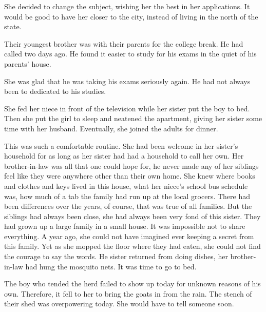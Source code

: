 \documentclass{article}
\begin{document}
She decided to change the subject, wishing her the best in her applications. It would be good to have her closer to the city, instead of living in the north of the state. 

Their youngest brother was with their parents for the college break. He had called two days ago. He found it easier to study for his exams in the quiet of his parents' house. 

She was glad that he was taking his exams seriously again. He had not always been to dedicated to his studies.

She fed her niece in front of the television while her sister put the boy to bed. Then she put the girl to sleep and neatened the apartment, giving her sister some time with her husband. Eventually, she joined the adults for dinner.
 
This was such a comfortable routine. She had been welcome in her sister's household for as long as her sister had had a household to call her own. Her brother-in-law was all that one could hope for, he never made any of her siblings feel like they were anywhere other than their own home. She knew where books and clothes and keys lived in this house, what her niece's school bus schedule was, how much of a tab the family had run up at the local grocers. There had been differences over the years, of course, that was true of all families. But the siblings had always been close, she had always been very fond of this sister. They had grown up a large family in a small house. It was impossible not to share everything. A year ago, she could not have imagined ever keeping a secret from this family. Yet as she mopped the floor where they had eaten, she could not find the courage to say the words. He sister returned from doing dishes, her brother-in-law had hung the mosquito nets. It was time to go to bed.

\vspace{.5cm}

The boy who tended the herd failed to show up today for unknown reasons of his own. Therefore, it fell to her to bring the goats in from the rain. The stench of their shed was overpowering today. She would have to tell someone soon.
\end{document}
